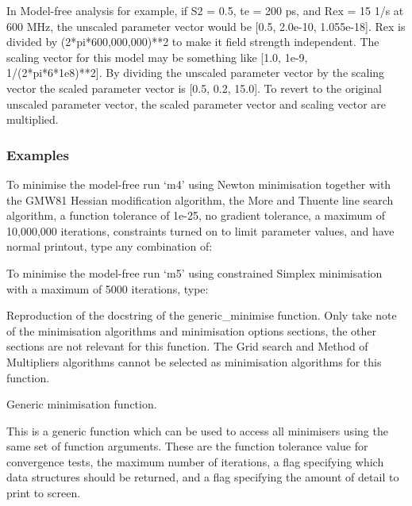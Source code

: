 In Model-free analysis for example, if S2 = 0.5, te = 200 ps, and Rex = 15 1/s at 600 MHz,
the unscaled parameter vector would be [0.5, 2.0e-10, 1.055e-18].  Rex is divided by
(2*pi*600,000,000)**2 to make it field strength independent.  The scaling vector for this
model may be something like [1.0, 1e-9, 1/(2*pi*6*1e8)**2].  By dividing the unscaled
parameter vector by the scaling vector the scaled parameter vector is [0.5, 0.2, 15.0].  To
revert to the original unscaled parameter vector, the scaled parameter vector and scaling
vector are multiplied.


\subsubsection{Examples}

To minimise the model-free run `m4' using Newton minimisation together with the GMW81
Hessian modification algorithm, the More and Thuente line search algorithm, a function
tolerance of 1e-25, no gradient tolerance, a maximum of 10,000,000 iterations, constraints
turned on to limit parameter values, and have normal printout, type any combination of:





To minimise the model-free run `m5' using constrained Simplex minimisation with a maximum of
5000 iterations, type:




Reproduction of the docstring of the generic\_minimise function.  Only take note of the
minimisation algorithms and minimisation options sections, the other sections are not
relevant for this function.  The Grid search and Method of Multipliers algorithms cannot be
selected as minimisation algorithms for this function.


Generic minimisation function.

This is a generic function which can be used to access all minimisers using the same set of
function arguments.  These are the function tolerance value for convergence tests, the maximum
number of iterations, a flag specifying which data structures should be returned, and a flag
specifying the amount of detail to print to screen.


